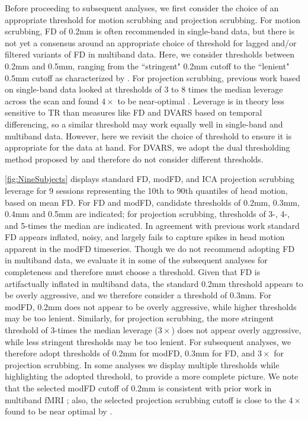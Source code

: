 \documentclass{article}
\begin{document}
Before proceeding to subsequent analyses, we first consider the choice of an appropriate threshold for motion scrubbing and projection scrubbing. For motion scrubbing, FD of 0.2mm is often recommended in single-band data, but there is not yet a consensus around an appropriate choice of threshold for lagged and/or filtered variants of FD in multiband data. Here, we consider thresholds between 0.2mm and 0.5mm, ranging from the ``stringent" 0.2mm cutoff to the ``lenient" 0.5mm cutoff as characterized by \citet{powerMethodsDetectCharacterize2014}. For projection scrubbing, previous work based on single-band data looked at thresholds of 3 to 8 times the median leverage across the scan and found $4\times$ to be near-optimal \citep{mejiaPCALeverageOutlier2017}. Leverage is in theory less sensitive to TR than measures like FD and DVARS based on temporal differencing, so a similar threshold may work equally well in single-band and multiband data. However, here we revisit the choice of threshold to ensure it is appropriate for the data at hand. For DVARS, we adopt the dual thresholding method proposed by \cite{afyouniInsightInferenceDVARS2018} and therefore do not consider different thresholds. 

\autoref{fig:NineSubjects} displays standard FD, modFD, and ICA projection scrubbing leverage for 9 sessions representing the 10th to 90th quantiles of head motion, based on mean FD. For FD and modFD, candidate thresholds of 0.2mm, 0.3mm, 0.4mm and 0.5mm are indicated; for projection scrubbing, thresholds of 3-, 4-, and 5-times the median are indicated. In agreement with previous work \citep{fairCorrectionRespiratoryArtifacts2020,power2019distinctions} standard FD appears inflated, noisy, and largely fails to capture spikes in head motion apparent in the modFD timeseries. Though we do not recommend adopting FD in multiband data, we evaluate it in some of the subsequent analyses for completeness and therefore must choose a threshold. Given that FD is artifactually inflated in multiband data, the standard 0.2mm threshold appears to be overly aggressive, and we therefore consider a threshold of 0.3mm. For modFD, 0.2mm does not appear to be overly aggressive, while higher thresholds may be too lenient. Similarly, for projection scrubbing, the more stringent threshold of 3-times the median leverage ($3\times$) does not appear overly aggressive, while less stringent thresholds may be too lenient. For subsequent analyses, we therefore adopt thresholds of 0.2mm for modFD, 0.3mm for FD, and $3\times$ for projection scrubbing. In some analyses we display multiple thresholds while highlighting the adopted threshold, to provide a more complete picture. We note that the selected modFD cutoff of 0.2mm is consistent with prior work in multiband fMRI \citep{fairCorrectionRespiratoryArtifacts2020, kaplan2022filtering}; also, the selected projection scrubbing cutoff is close to the $4\times$ found to be near optimal by \cite{mejiaPCALeverageOutlier2017}.
\end{document}

